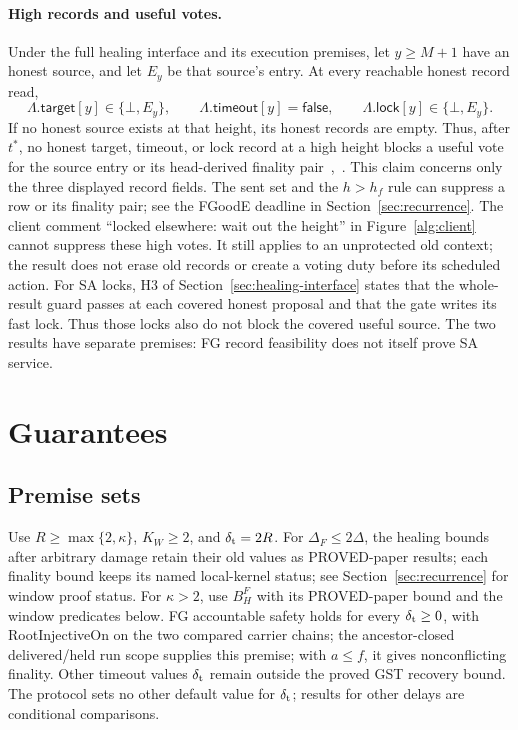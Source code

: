 \documentclass{article}
\theoremstyle{plain}
\theoremstyle{definition}
\theoremstyle{remark}
\begin{document}
\paragraph{High records and useful votes.}
Under the full healing interface and its execution premises, let
$y\geq M+1$ have an honest source, and let $E_y$ be that source's
entry.  At every reachable honest record read,
\[
 \Lambda.\mathsf{target}[y]\in\{\bot,E_y\},\qquad
 \Lambda.\mathsf{timeout}[y]=\mathsf{false},\qquad
 \Lambda.\mathsf{lock}[y]\in\{\bot,E_y\}.
\]
If no honest source exists at that height, its honest records are
empty.  Thus, after $t^*$, no honest target, timeout, or lock record
at a high height blocks a useful vote for the source entry or its
head-derived finality pair~\cite[FF2]{BPF},~\cite[\S4, E-ST]{SL175}.
This claim concerns only the three displayed record fields.
The sent set and the $h>h_f$ rule can suppress a row or its finality
pair; see the FGoodE deadline in Section~\ref{sec:recurrence}.
The client comment ``locked elsewhere: wait out the height'' in
Figure~\ref{alg:client} cannot suppress these high votes.  It still
applies to an unprotected old context; the result does not erase old
records or create a voting duty before its scheduled action.
For SA locks, H3 of Section~\ref{sec:healing-interface} states that
the whole-result guard passes at each covered honest proposal and
that the gate writes its fast lock.  Thus those locks also do not
block the covered useful source.  The two results have separate
premises: FG record feasibility does not itself prove SA service.

\section{Guarantees}\label{sec:guarantees}

\subsection{Premise sets}\label{sec:premises}

Use $R\geq\max\{2,\kappa\}$, $K_W\geq2$, and $\delta_{\rm t}=2R$.
For $\Delta_F\leq2\Delta$, the healing bounds after arbitrary damage retain their old values as
PROVED-paper results; each finality bound keeps its named local-kernel status;
see Section~\ref{sec:recurrence} for window proof status.
For $\kappa>2$, use $B_H^F$
with its PROVED-paper bound and the window predicates below.
FG accountable safety holds for every $\delta_{\rm t}\geq0$, with
\textsf{RootInjectiveOn} on the two compared carrier chains; the
ancestor-closed delivered/held run scope supplies this premise;
with $a\leq f$, it gives nonconflicting finality.  Other timeout values $\delta_{\rm t}$ remain
outside the proved GST recovery bound.  The protocol sets no other
default value for $\delta_{\rm t}$; results for other delays are conditional comparisons.
\end{document}
